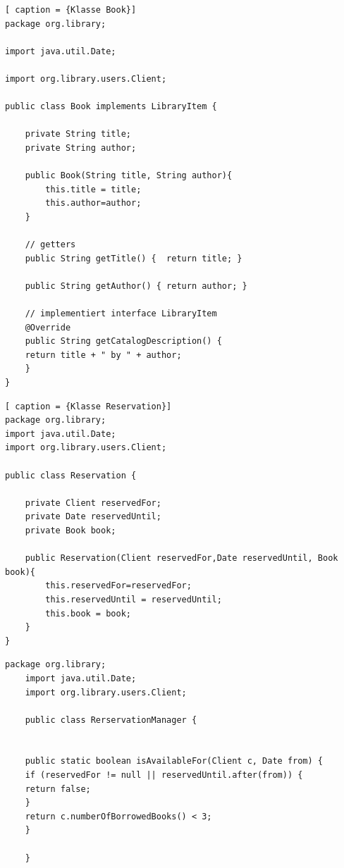 \begin{lstlisting}[	caption = {Klasse Book}]
package org.library;

import java.util.Date;

import org.library.users.Client;

public class Book implements LibraryItem {
	
	private String title;
	private String author;
	
	public Book(String title, String author){
		this.title = title;
		this.author=author;
	}

	// getters
	public String getTitle() {  return title; }
	
	public String getAuthor() { return author; }

	// implementiert interface LibraryItem
	@Override
	public String getCatalogDescription() {
	return title + " by " + author;  
	}
}
\end{lstlisting}

\begin{lstlisting}[	caption = {Klasse Reservation}]
package org.library;
import java.util.Date;
import org.library.users.Client;

public class Reservation {

	private Client reservedFor;
	private Date reservedUntil;    
	private Book book;
	
	public Reservation(Client reservedFor,Date reservedUntil, Book book){
		this.reservedFor=reservedFor;
		this.reservedUntil = reservedUntil;
		this.book = book;
	}
}
\end{lstlisting}

\begin{lstlisting}[caption = {RerservationManager}]
	package org.library;
	import java.util.Date;
	import org.library.users.Client;
	
	public class RerservationManager {
	

	public static boolean isAvailableFor(Client c, Date from) {
	if (reservedFor != null || reservedUntil.after(from)) {
	return false;
	}
	return c.numberOfBorrowedBooks() < 3;
	}
	
	}
\end{lstlisting}

